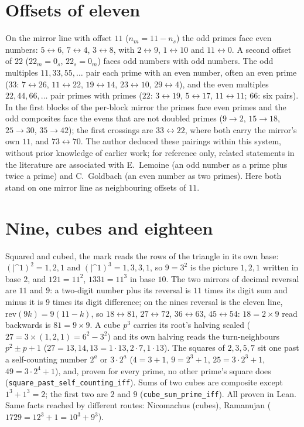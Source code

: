 \documentclass[11pt]{article}
\begin{document}
\section{Offsets of eleven}
On the mirror line with offset $11$ ($n_m = 11 - n_s$) the odd primes face even numbers: $5\leftrightarrow6$, $7\leftrightarrow4$, $3\leftrightarrow8$, with $2\leftrightarrow9$, $1\leftrightarrow10$ and $11\leftrightarrow0$. A second offset of $22$ ($22_m = 0_s$, $22_s = 0_m$) faces odd numbers with odd numbers. The odd multiples $11, 33, 55, \dots$ pair each prime with an even number, often an even prime ($33$: $7\leftrightarrow26$, $11\leftrightarrow22$, $19\leftrightarrow14$, $23\leftrightarrow10$, $29\leftrightarrow4$), and the even multiples $22, 44, 66, \dots$ pair primes with primes ($22$: $3\leftrightarrow19$, $5\leftrightarrow17$, $11\leftrightarrow11$; $66$: six pairs). In the first blocks of the per-block mirror the primes face even primes and the odd composites face the evens that are not doubled primes ($9\to2$, $15\to18$, $25\to30$, $35\to42$); the first crossings are $33\leftrightarrow22$, where both carry the mirror's own $11$, and $73\leftrightarrow70$. The author deduced these pairings within this system, without prior knowledge of earlier work; for reference only, related statements in the literature are associated with E.~Lemoine (an odd number as a prime plus twice a prime) and C.~Goldbach (an even number as two primes). Here both stand on one mirror line as neighbouring offsets of $11$.

\section{Nine, cubes and eighteen}
Squared and cubed, the mark reads the rows of the triangle in its own base: $(|\text{\textasciicircum}1)^2 = 1,2,1$ and $(|\text{\textasciicircum}1)^3 = 1,3,3,1$, so $9 = 3^2$ is the picture $1,2,1$ written in base $2$, and $121 = 11^2$, $1331 = 11^3$ in base $10$. The two mirrors of decimal reversal are $11$ and $9$: a two-digit number plus its reversal is $11$ times its digit sum and minus it is $9$ times its digit difference; on the nines reversal is the eleven line, $\mathrm{rev}(9k) = 9(11-k)$, so $18\leftrightarrow81$, $27\leftrightarrow72$, $36\leftrightarrow63$, $45\leftrightarrow54$: $18 = 2\times9$ read backwards is $81 = 9\times9$. A cube $p^3$ carries its root's halving scaled ($27 = 3\times(1,2,1) = 6^2-3^2$) and its own halving reads the turn-neighbours $p^2\pm p+1$ ($27 = 13,14,13 = 1\cdot13, 2\cdot7, 1\cdot13$). The squares of $2, 3, 5, 7$ sit one past a self-counting number $2^a$ or $3\cdot2^a$ ($4 = 3+1$, $9 = 2^3+1$, $25 = 3\cdot2^3+1$, $49 = 3\cdot2^4+1$), and, proven for every prime, no other prime's square does (\texttt{square\_past\_self\_counting\_iff}). Sums of two cubes are composite except $1^3+1^3 = 2$; the first two are $2$ and $9$ (\texttt{cube\_sum\_prime\_iff}). All proven in Lean. Same facts reached by different routes: Nicomachus (cubes), Ramanujan ($1729 = 12^3+1 = 10^3+9^3$).
\end{document}
